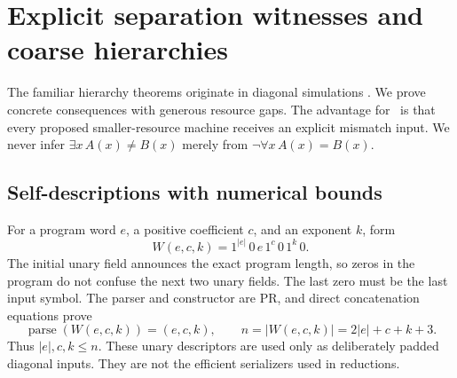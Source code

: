 \section{Explicit separation witnesses and coarse hierarchies}
\label{sec:hierarchy}

The familiar hierarchy theorems originate in diagonal simulations \cite{HartmanisStearns1965,HennieStearns1966}. We prove concrete consequences with generous resource gaps. The advantage for \ipra\ is that every proposed smaller-resource machine receives an explicit mismatch input. We never infer $\exists x\,A(x)\ne B(x)$ merely from $\neg\forall x\,A(x)=B(x)$.

\subsection{Self-descriptions with numerical bounds}
For a program word $e$, a positive coefficient $c$, and an exponent $k$, form
\[
 W(e,c,k)=1^{|e|}\,0\,e\,1^c\,0\,1^k\,0.
\]
The initial unary field announces the exact program length, so zeros in the program do not confuse the next two unary fields. The last zero must be the last input symbol. The parser and constructor are PR, and direct concatenation equations prove
\[
 \operatorname{parse}(W(e,c,k))=(e,c,k),\qquad
 n=|W(e,c,k)|=2|e|+c+k+3.
\]
Thus $|e|,c,k\le n$. These unary descriptors are used only as deliberately padded diagonal inputs. They are not the efficient serializers used in reductions.

